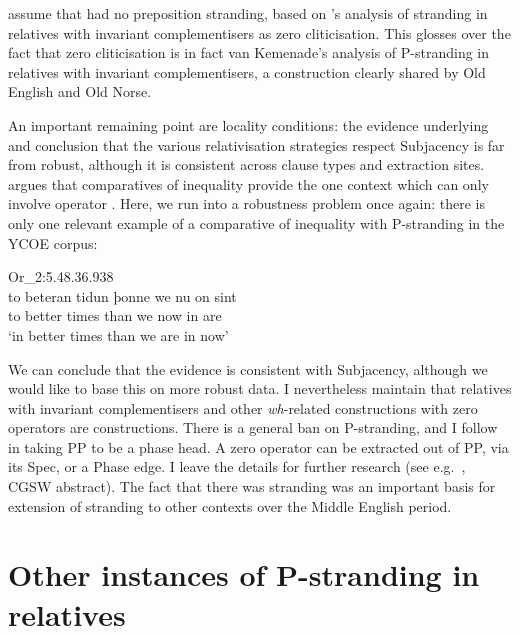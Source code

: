 \documentclass[output=paper]{langsci/langscibook}
\begin{document}
\citet{EmoFaa2014} assume that  had no preposition stranding, based
on ’s analysis of stranding in relatives with
invariant complementisers as zero cliticisation. This glosses over the fact
that zero cliticisation is in fact van Kemenade’s analysis of P-stranding in
relatives with invariant complementisers, a construction clearly shared by Old
English and Old Norse.

An important remaining point are locality conditions: the evidence underlying
 and  conclusion that the various
relativisation strategies respect Subjacency is far from robust, although it is
consistent across clause types and extraction sites. \citet[181--186]{Abels2003}
argues that comparatives of inequality provide the one context which can only
involve operator . Here, we run into a robustness problem once again:
there is only one relevant example of a comparative of inequality with
P-stranding in the YCOE corpus:

\ea Or\_2:5.48.36.938%
    \label{ex:key:11.9}\\
     \gll to beteran tidun  þonne we nu    on sint \\
        to better    times than    we now in  are \\
    \glt ‘in better times than we are in now’
\z

We can conclude that the evidence is consistent with Subjacency, although we
would like to base this on more robust data. I nevertheless maintain that
relatives with invariant complementisers and other \textit{wh}-related
constructions with zero operators are  constructions. There is a
general ban on P-stranding, and I follow \textcite{Abels2003,Abels2012} in
taking PP to be a phase head. A zero operator can be extracted out of PP, via
its Spec, or a Phase edge. I leave the details for further research (see e.g.\
\citealt{Walkden2017}, CGSW abstract). The fact that there was stranding was an
important basis for extension of stranding to other contexts over the Middle
English period.

\section{Other instances of P-stranding in relatives}
\end{document}
